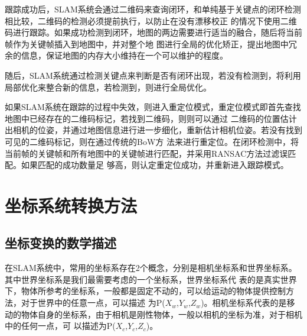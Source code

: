 跟踪成功后，SLAM系统会通过二维码来查询闭环，和单纯基于关键点的闭环检测相比较，二维码的检测必须提前执行，以防止在没有漂移校正
的情况下使用二维码进行跟踪。如果成功检测到闭环，地图的两边需要进行适当的融合，随后将当前帧作为关键帧插入到地图中，并对整个地
图进行全局的优化矫正，提出地图中冗余的信息，保证地图的内存大小维持在一个可以维护的程度。

随后，SLAM系统通过检测关键点来判断是否有闭环出现，若没有检测到，将利用局部优化来整合新的信息，若检测到，则进行全局优化。

如果SLAM系统在跟踪的过程中失效，则进入重定位模式，重定位模式即首先查找地图中已经存在的二维码标记，若找到二维码，则则可以通过
二维码的位置估计出相机的位姿，并通过地图信息进行进一步细化，重新估计相机位姿。若没有找到可见的二维码标记，则在通过传统的BoW方
法来进行重定位。在闭环检测中，将当前帧的关键帧和所有地图中的关键帧进行匹配，并采用RANSAC方法过滤误匹配。如果匹配的成功数量足
够高，则认定重定位成功，并重新进入跟踪模式。
\section{坐标系统转换方法}
\label{chap:chap2.4}
\subsection{坐标变换的数学描述}
\label{chap:chap2.4.1}
在SLAM系统中，常用的坐标系存在2个概念，分别是相机坐标系和世界坐标系。其中世界坐标系是我们最需要考虑的一个坐标系，世界坐标系代
表的是真实世界下，物体所参考的坐标系，一般都是固定不动的，可以给运动的物体提供控制方法，对于世界中的任意一点，可以描述
为P($X_w$,$Y_w$,$Z_w$)。相机坐标系代表的是移动的物体自身的坐标系，由于相机是刚性物体，一般以相机的坐标为准，对于相机中的任何一点，可
以描述为P($X_c$,$Y_c$,$Z_c$)。

